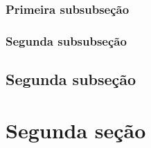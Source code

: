 \documentclass[a4paper,12pt,oneside,onecolumn]{uerj}
\begin{document}
\subsubsection{Primeira subsubseção}

\subsubsection{Segunda subsubseção}

\subsection{Segunda subseção}

\section{Segunda seção}


\printindex
\end{document}
